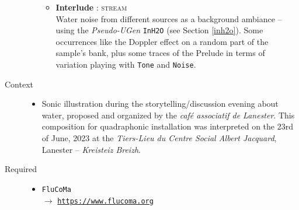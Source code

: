 \begin{description}
\begin{itemize}
\begin{itemize}[leftmargin=0.4in]
		\item \textbf{Interlude} : \textsc{stream} \\ Water noise from different sources as a background ambiance -- using the \textit{Pseudo-UGen} \texttt{InH2O} (see Section \ref{inh2o}). Some occurrences like the Doppler effect on a random part of the sample's bank, plus some traces of the Prelude in terms of variation playing with \texttt{Tone} and \texttt{Noise}.
		\end{itemize}
	\end{itemize}

\item[Context] \hfill 
	\begin{itemize}
	\item[] Sonic illustration during the storytelling/discussion evening about water, proposed and organized by the \textit{café associatif de Lanester}. This composition for quadraphonic installation was interpreted on the 23rd of June, 2023 at the \textit{Tiers-Lieu du Centre Social Albert Jacquard}, Lanester -- \textit{Kreisteiz Breizh}.
	\end{itemize}

\item[Required] \hfill 
\begin{itemize}
\setlength\itemsep{1em}
\item[] \texttt{FluCoMa} \\ $\rightarrow$ \href{https://www.flucoma.org}{\texttt{\small https://www.flucoma.org}}
\end{itemize}


\end{description}
